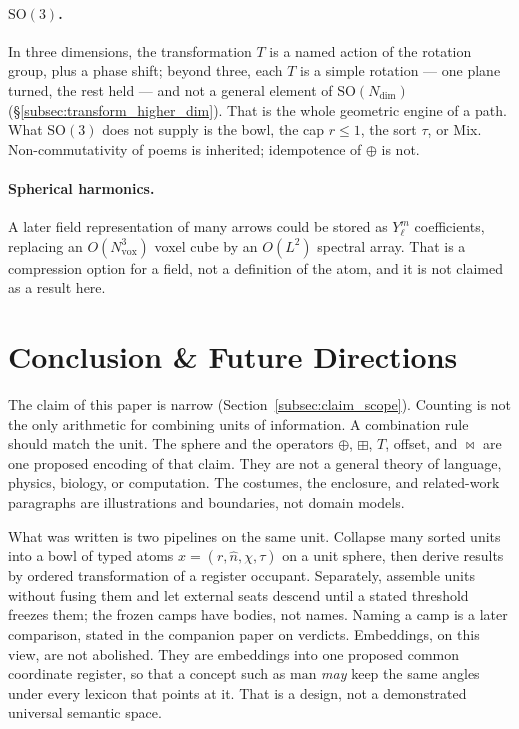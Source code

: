 \documentclass[12pt, a4paper]{article}
\begin{document}
\paragraph{$\mathrm{SO}(3)$.}
In three dimensions, the transformation $T$ is a named action of the
rotation group, plus a phase shift; beyond three, each $T$ is a simple
rotation --- one plane turned, the rest held --- and not a general
element of $\mathrm{SO}(N_{\mathrm{dim}})$
(\S\ref{subsec:transform_higher_dim}). That is the whole geometric engine of a path. What
$\mathrm{SO}(3)$ does not supply is the bowl, the cap $r\le 1$, the
sort $\tau$, or Mix. Non-commutativity of poems is inherited;
idempotence of $\oplus$ is not.

\paragraph{Spherical harmonics.}
A later field representation of many arrows could be stored as
$Y_\ell^m$ coefficients, replacing an $O(N_{\mathrm{vox}}^3)$ voxel cube by an
$O(L^2)$ spectral array. That is a compression option for a field, not
a definition of the atom, and it is not claimed as a result here.

\section{Conclusion \& Future Directions}
\label{sec:conclusion}

The claim of this paper is narrow
(Section~\ref{subsec:claim_scope}). Counting is not the only
arithmetic for combining units of information. A combination rule
should match the unit. The sphere and the operators
$\oplus$, $\boxplus$, $T$, offset, and $\bowtie$ are one proposed
encoding of that claim. They are not a general theory of language,
physics, biology, or computation. The costumes, the enclosure, and
related-work paragraphs are illustrations and boundaries, not domain
models.

What was written is two pipelines on the same unit. Collapse many
sorted units into a bowl of typed atoms $x=(r,\hat n,\chi,\tau)$ on a
unit sphere, then derive results by ordered transformation of a
register occupant. Separately, assemble units without fusing them
and let external seats descend until a stated threshold freezes
them; the frozen camps have bodies, not names. Naming a camp is a later comparison, stated in the companion
paper on verdicts.
Embeddings, on this view, are
not abolished. They are embeddings into one proposed common coordinate
register, so that a
concept such as $\mathrm{man}$ \emph{may} keep the same angles under every
lexicon that points at it. That is a design, not a demonstrated
universal semantic space.
\end{document}
